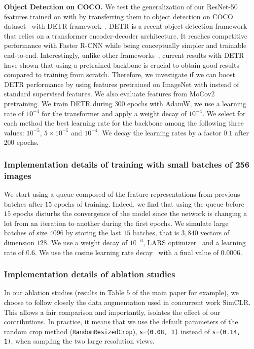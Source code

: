 \par \noindent \textbf{Object Detection on COCO.}
We test the generalization of our ResNet-50 features trained on \ImNet with \OURS by transferring them to object detection on COCO dataset~\cite{lin2014microsoft} with DETR framework~\cite{carion2020end}.
DETR is a recent object detection framework that relies on a transformer encoder-decoder architecture.
It reaches competitive performance with Faster R-CNN while being conceptually simpler and trainable end-to-end.
Interestingly, unlike other frameworks~\cite{he2019rethinking}, current results with DETR have shown that using a pretrained backbone is crucial to obtain good results compared to training from scratch.
Therefore, we investigate if we can boost DETR performance by using features pretrained on ImageNet with \OURS instead of standard supervised features.
We also evaluate features from MoCov2~\cite{chen2020improved} pretraining.
We train DETR during $300$ epochs with AdamW, we use a learning rate of $10^{-4}$ for the transformer and apply a weight decay of $10^{-4}$.
We select for each method the best learning rate for the backbone among the following three values: $10^{-5}$, $5 \times 10^{-5}$ and $10^{-4}$.
We decay the learning rates by a factor $0.1$ after $200$ epochs.

\subsubsection{Implementation details of training with small batches of 256 images}
We start using a queue composed of the feature representations from previous batches after $15$ epochs of training.
Indeed, we find that using the queue before $15$ epochs disturbs the convergence of the model since the network is changing a lot from an iteration to another during the first epochs.
We simulate large batches of size $4096$ by storing the last $15$ batches, that is $3,840$ vectors of dimension $128$.
We use a weight decay of $10^{-6}$, LARS optimizer~\cite{you2017large} and a learning rate of $0.6$.
We use the cosine learning rate decay~\cite{loshchilov2016sgdr} with a final value of $0.0006$.

\subsubsection{Implementation details of ablation studies}
In our ablation studies (results in Table $5$ of the main paper for example), we choose to follow closely the data augmentation used in concurrent work SimCLR.
This allows a fair comparison and importantly, isolates the effect of our contributions.
In practice, it means that we use the default parameters of the random crop method (\texttt{RandomResizedCrop}), \texttt{s=(0.08, 1)} instead of \texttt{s=(0.14, 1)}, when sampling the two large resolution views.

